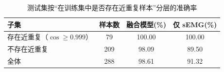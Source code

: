 \begin{table}[htbp]\centering
\caption{测试集按“在训练集中是否存在近重复样本”分层的准确率}
\label{tab:dup}
\begin{tabular}{lccc}
\toprule
子集 & 样本数 & 融合模型(\%) & 仅 sEMG(\%) \\
\midrule
存在近重复（$\cos\ge 0.999$） & 79 & 100.00 & 100.00 \\
不存在近重复 & 209 & 98.09 & 89.50 \\
\midrule
全体 & 288 & 98.61 & 91.32 \\
\bottomrule
\end{tabular}
\end{table}
